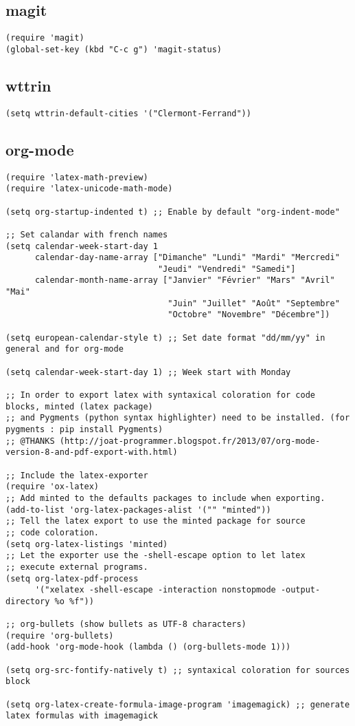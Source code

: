 \documentclass[11pt]{article}
\begin{document}
\subsection{magit}
\label{sec-2-4}
\begin{verbatim}
(require 'magit)
(global-set-key (kbd "C-c g") 'magit-status)
\end{verbatim}
\subsection{wttrin}
\label{sec-2-5}
\begin{verbatim}
(setq wttrin-default-cities '("Clermont-Ferrand"))
\end{verbatim}
\subsection{org-mode}
\label{sec-2-6}
\begin{verbatim}
(require 'latex-math-preview)
(require 'latex-unicode-math-mode)

(setq org-startup-indented t) ;; Enable by default "org-indent-mode"

;; Set calandar with french names
(setq calendar-week-start-day 1
      calendar-day-name-array ["Dimanche" "Lundi" "Mardi" "Mercredi"
                               "Jeudi" "Vendredi" "Samedi"]
      calendar-month-name-array ["Janvier" "Février" "Mars" "Avril" "Mai"
                                 "Juin" "Juillet" "Août" "Septembre"
                                 "Octobre" "Novembre" "Décembre"])

(setq european-calendar-style t) ;; Set date format "dd/mm/yy" in general and for org-mode

(setq calendar-week-start-day 1) ;; Week start with Monday

;; In order to export latex with syntaxical coloration for code blocks, minted (latex package)
;; and Pygments (python syntax highlighter) need to be installed. (for pygments : pip install Pygments)
;; @THANKS (http://joat-programmer.blogspot.fr/2013/07/org-mode-version-8-and-pdf-export-with.html)

;; Include the latex-exporter
(require 'ox-latex)
;; Add minted to the defaults packages to include when exporting.
(add-to-list 'org-latex-packages-alist '("" "minted"))
;; Tell the latex export to use the minted package for source
;; code coloration.
(setq org-latex-listings 'minted)
;; Let the exporter use the -shell-escape option to let latex
;; execute external programs.
(setq org-latex-pdf-process
      '("xelatex -shell-escape -interaction nonstopmode -output-directory %o %f"))

;; org-bullets (show bullets as UTF-8 characters)
(require 'org-bullets)
(add-hook 'org-mode-hook (lambda () (org-bullets-mode 1)))

(setq org-src-fontify-natively t) ;; syntaxical coloration for sources block

(setq org-latex-create-formula-image-program 'imagemagick) ;; generate latex formulas with imagemagick
\end{verbatim}
\end{document}
